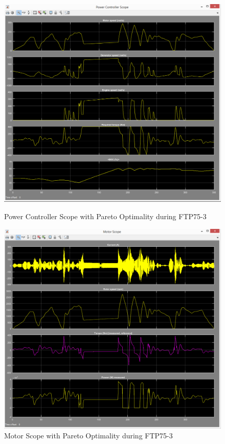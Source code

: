\begin{figure}[hp]
\centering
\includegraphics[scale=0.4]{figures/Pareto/FTP75-3/powerController08Juni}
\caption{Power Controller Scope with Pareto Optimality during FTP75-3}
\label{fig:pcpo3}
\includegraphics[scale=0.42]{figures/Pareto/FTP75-3/motor08Juni}
\caption{Motor Scope with Pareto Optimality during FTP75-3}
\label{fig:mpo3}
\end{figure}


